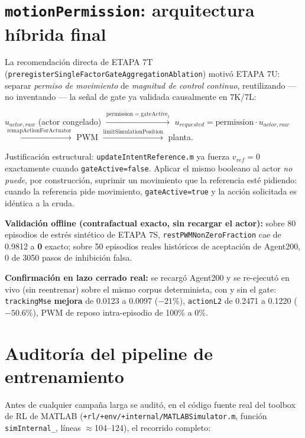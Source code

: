 \documentclass[11pt,a4paper]{article}
\begin{document}
\section{\texttt{motionPermission}: arquitectura híbrida final}
\label{sec:motion-permission}

La recomendación directa de ETAPA 7T (\texttt{preregisterSingleFactorGateAggregationAblation})
motivó ETAPA 7U: separar \emph{permiso de movimiento} de \emph{magnitud de control
continuo}, reutilizando --- no inventando --- la señal de gate ya validada
causalmente en 7K/7L:

\begin{center}
$u_{actor,raw}$ (actor congelado) $\xrightarrow{\text{permission}=\text{gateActive}_t}$
$u_{requested} = \text{permission}\cdot u_{actor,raw}$
$\xrightarrow{\text{remapActionForActuator}}$ PWM
$\xrightarrow{\text{limitSimulationPosition}}$ planta.
\end{center}

Justificación estructural: \texttt{updateIntentReference.m} ya fuerza $v_{ref}=0$
exactamente cuando \texttt{gateActive=false}. Aplicar el mismo booleano al actor
\emph{no puede}, por construcción, suprimir un movimiento que la referencia esté
pidiendo: cuando la referencia pide movimiento, \texttt{gateActive=true} y la acción
solicitada es idéntica a la cruda.

\textbf{Validación offline (contrafactual exacto, sin recargar el actor):} sobre 80
episodios de estrés sintético de ETAPA 7S, \texttt{restPWMNonZeroFraction} cae de
0.9812 a \textbf{0} exacto; sobre 50 episodios reales históricos de aceptación de
Agent200, 0 de 3050 pasos de inhibición falsa.

\textbf{Confirmación en lazo cerrado real:} se recargó Agent200 y se re-ejecutó en vivo
(sin reentrenar) sobre el mismo corpus determinista, con y sin el gate:
\texttt{trackingMse} \textbf{mejora} de 0.0123 a 0.0097 ($-21\%$), \texttt{actionL2} de
0.2471 a 0.1220 ($-50.6\%$), PWM de reposo intra-episodio de 100\% a 0\%.

\section{Auditoría del pipeline de entrenamiento}
\label{sec:auditoria-pipeline}

Antes de cualquier campaña larga se auditó, en el código fuente real del toolbox de RL
de MATLAB (\texttt{+rl/+env/+internal/MATLABSimulator.m}, función \texttt{simInternal\_},
líneas $\approx$104--124), el recorrido completo:
\end{document}
